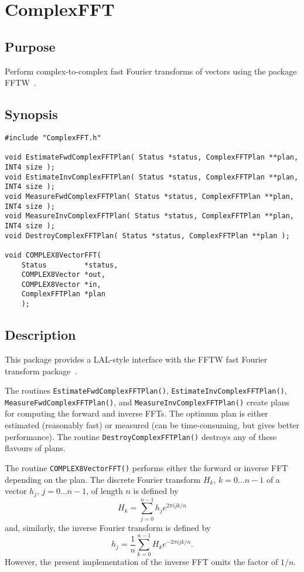 \documentclass{article}
\begin{document}
\section{ComplexFFT}

\subsection{Purpose}

Perform complex-to-complex fast Fourier transforms of vectors using the
package FFTW~\cite{fj:1998}.

\subsection{Synopsis}


\begin{verbatim}
#include "ComplexFFT.h"

void EstimateFwdComplexFFTPlan( Status *status, ComplexFFTPlan **plan, INT4 size );
void EstimateInvComplexFFTPlan( Status *status, ComplexFFTPlan **plan, INT4 size );
void MeasureFwdComplexFFTPlan( Status *status, ComplexFFTPlan **plan, INT4 size );
void MeasureInvComplexFFTPlan( Status *status, ComplexFFTPlan **plan, INT4 size );
void DestroyComplexFFTPlan( Status *status, ComplexFFTPlan **plan );

void COMPLEX8VectorFFT(
    Status         *status,
    COMPLEX8Vector *out,
    COMPLEX8Vector *in,
    ComplexFFTPlan *plan
    );
\end{verbatim}

\subsection{Description}

This package provides a LAL-style interface with the FFTW fast Fourier
transform package~\cite{fj:1998}.

The routines \texttt{EstimateFwdComplexFFTPlan()},
\texttt{EstimateInvComplexFFTPlan()}, \texttt{MeasureFwdComplexFFTPlan()}, and
\texttt{MeasureInvComplexFFTPlan()} create plans for computing the forward and
inverse FFTs.  The optimum plan is either estimated (reasonably fast) or
measured (can be time-consuming, but gives better performance).  The routine
\texttt{DestroyComplexFFTPlan()} destroys any of these flavours of plans.

The routine \texttt{COMPLEX8VectorFFT()} performs either the forward or
inverse FFT depending on the plan.  The discrete Fourier transform $H_k$,
$k=0\ldots n-1$ of a vector $h_j$, $j=0\ldots n-1$, of length $n$ is defined
by
\[
  H_k = \sum_{j=0}^{n-1} h_j e^{2\pi ijk/n}
\]
and, similarly, the inverse Fourier transform is defined by
\[
  h_j = \frac{1}{n}\sum_{k=0}^{n-1} H_k e^{-2\pi ijk/n}.
\]
However, the present implementation of the inverse FFT omits the factor of
$1/n$.
\end{document}
